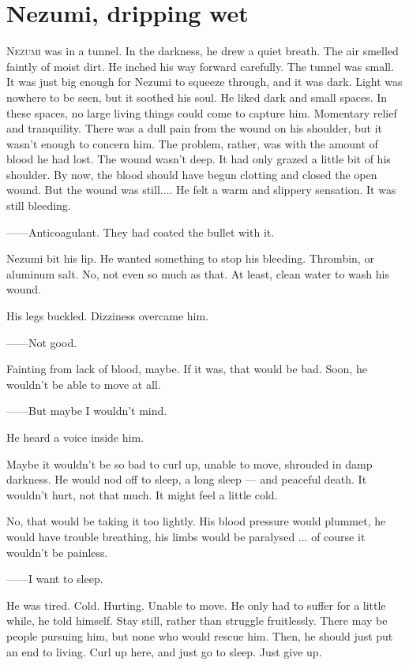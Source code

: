 
\chapter{Nezumi, dripping wet}

\lettrine{N}{ezumi} was in a tunnel. In the darkness, he drew a quiet breath. The air
smelled faintly of moist dirt. He inched his way forward carefully. The
tunnel was small. It was just big enough for Nezumi to squeeze through,
and it was dark. Light was nowhere to be seen, but it soothed his soul.
He liked dark and small spaces. In these spaces, no large living things
could come to capture him. Momentary relief and tranquility. There was a
dull pain from the wound on his shoulder, but it wasn't enough to
concern him. The problem, rather, was with the amount of blood he had
lost. The wound wasn't deep. It had only grazed a little bit of his
shoulder. By now, the blood should have begun clotting and closed the
open wound. But the wound was still.... He felt a warm and slippery
sensation. It was still bleeding.

------Anticoagulant. They had coated the bullet with it.

Nezumi bit his lip. He wanted something to stop his bleeding. Thrombin,
or aluminum salt. No, not even so much as that. At least, clean water to
wash his wound.

His legs buckled. Dizziness overcame him.

------Not good.

Fainting from lack of blood, maybe. If it was, that would be bad. Soon,
he wouldn't be able to move at all.

------But maybe I wouldn't mind.

He heard a voice inside him.

Maybe it wouldn't be so bad to curl up, unable to move, shrouded in damp
darkness. He would nod off to sleep, a long sleep --- and peaceful death.
It wouldn't hurt, not that much. It might feel a little cold.

No, that would be taking it too lightly. His blood pressure would
plummet, he would have trouble breathing, his limbs would be paralysed
... of course it wouldn't be painless.

------I want to sleep.

He was tired. Cold. Hurting. Unable to move. He only had to suffer for a
little while, he told himself. Stay still, rather than struggle
fruitlessly. There may be people pursuing him, but none who would rescue
him. Then, he should just put an end to living. Curl up here, and just
go to sleep. Just give up.

